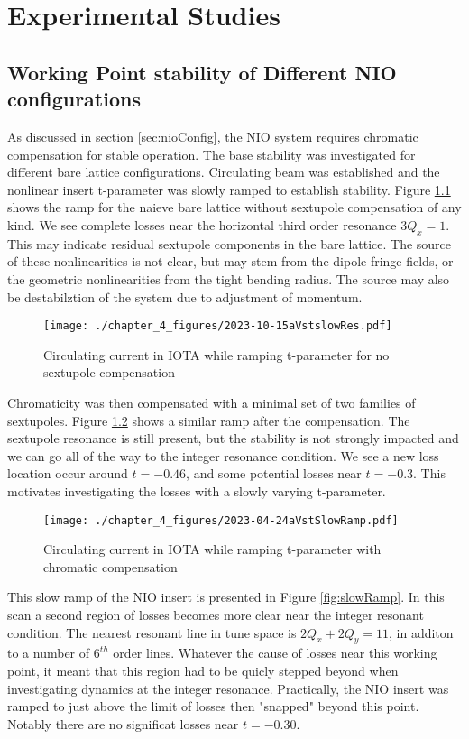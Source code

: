 \chapter{Experimental Studies} \label{chap:expResults}

\section{Working Point stability of Different NIO configurations} \label{sec:nioWorkPoint}
As discussed in section \ref{sec:nioConfig}, the NIO system requires chromatic compensation for stable operation. The base stability was investigated for different bare lattice configurations. Circulating beam was established and the nonlinear insert t-parameter was slowly ramped to establish stability. Figure \ref{fig:bareRamp} shows the ramp for the naieve bare lattice without sextupole compensation of any kind. We see complete losses near the horizontal third order resonance $3 Q_x = 1$. This may indicate residual sextupole components in the bare lattice. The source of these nonlinearities is not clear, but may stem from the dipole fringe fields, or the geometric nonlinearities from the tight bending radius. The source may also be destabilztion of the system due to adjustment of momentum.

\begin{figure}
	\centering
	\texttt{[image: ./chapter\_4\_figures/2023-10-15aVstslowRes.pdf]}
	\caption{Circulating current in IOTA while ramping t-parameter for no sextupole compensation}
	\label{fig:bareRamp}
\end{figure}


Chromaticity was then compensated with a minimal set of two families of sextupoles. Figure \ref{fig:midRamp} shows a similar ramp after the compensation. The sextupole resonance is still present, but the stability is not strongly impacted and we can go all of the way to the integer resonance condition. We see a new loss location occur around $t=-0.46$, and some potential losses near $t=-0.3$. This motivates investigating the losses with a slowly varying t-parameter.

\begin{figure}
	\centering
	\texttt{[image: ./chapter\_4\_figures/2023-04-24aVstSlowRamp.pdf]}
	\caption{Circulating current in IOTA while ramping t-parameter with chromatic compensation}
	\label{fig:midRamp}
\end{figure}


This slow ramp of the NIO insert is presented in Figure \ref{fig:slowRamp}. In this scan a second region of losses becomes more clear near the integer resonant condition. The nearest resonant line in tune space is $2Q_x + 2Q_y = 11$, in additon to a number of $6^{th}$ order lines. Whatever the cause of losses near this working point, it meant that this region had to be quicly stepped beyond when investigating dynamics at the integer resonance. Practically, the NIO insert was ramped to just above the limit of losses then "snapped" beyond this point. Notably there are no significat losses near $t=-0.30$.

